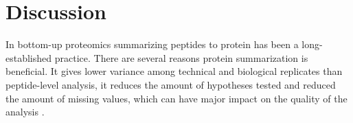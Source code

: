 \documentclass[10pt,letterpaper]{article}
\begin{document}

\section*{Discussion}

In bottom-up proteomics summarizing peptides to protein has been a long-established practice. There are several reasons protein summarization is beneficial. It gives lower variance among technical and biological replicates than peptide-level analysis, it reduces the amount of hypotheses tested and reduced the amount of missing values, which can have major impact on the quality of the analysis \cite{plubell2021can}.   
\end{document}
